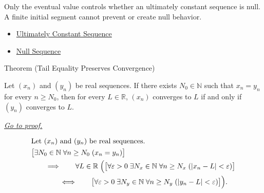 \begin{remark*}[Interpretation]
Only the eventual value controls whether an ultimately constant sequence is
null. A finite initial segment cannot prevent or create null behavior.
\end{remark*}

\begin{dependencies}
\begin{itemize}
  \item \hyperref[def:ultimately-constant-sequence]{Ultimately Constant Sequence}
  \item \hyperref[def:null-sequence]{Null Sequence}
\end{itemize}
\end{dependencies}


\begin{theorembox}{Theorem (Tail Equality Preserves Convergence)}
\begin{theorem}
\label{thm:tail-equality-preserves-convergence}
Let $(x_n)$ and $(y_n)$ be real sequences. If there exists
$N_0 \in \mathbb{N}$ such that $x_n = y_n$ for every $n \ge N_0$, then
for every $L \in \mathbb{R}$, $(x_n)$ converges to $L$ if and only if
$(y_n)$ converges to $L$.

\smallskip
\noindent
\hyperref[prf:tail-equality-preserves-convergence]{\textit{Go to proof.}}
\end{theorem}
\end{theorembox}

\begin{remark*}
\[
\begin{aligned}
&\text{Let } (x_n) \text{ and } (y_n) \text{ be real sequences.}\\
&\bigl[
\exists N_0 \in \mathbb{N}\;
\forall n \ge N_0\;(x_n = y_n)
\bigr]\\
&\qquad\Longrightarrow\qquad
\forall L \in \mathbb{R}\;
\Bigl(
\bigl[
\forall \varepsilon > 0\;
\exists N_x \in \mathbb{N}\;
\forall n \ge N_x\;(|x_n - L| < \varepsilon)
\bigr]\\
&\qquad\qquad\Longleftrightarrow\qquad
\bigl[
\forall \varepsilon > 0\;
\exists N_y \in \mathbb{N}\;
\forall n \ge N_y\;(|y_n - L| < \varepsilon)
\bigr]
\Bigr).
\end{aligned}
\]
\end{remark*}

